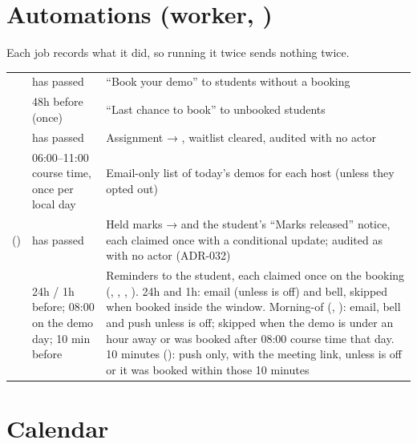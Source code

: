 \section[Automations]{Automations (worker, )}

Each job records what it did, so running it twice sends nothing twice.

{\tablefont
\begin{xltabular}{\linewidth}{@{}P{30mm} P{30mm} L@{}}
  \toprule
   &  & \\
  \midrule
  \endhead
   &  has passed & ``Book your demo'' to students without a booking\\
   & 48h before  (once) & ``Last chance to book'' to unbooked students\\
   &  has passed & Assignment → , waitlist cleared, audited with no actor\\
   & 06:00--11:00 course time, once per local day & Email-only list of today's demos for each host (unless they opted out)\\
   () &  has passed & Held marks →  and the student's ``Marks released'' notice, each claimed once with a conditional update; audited as  with no actor (ADR-032)\\
   & 24h / 1h before; 08:00 on the demo day; 10 min before & Reminders to the student, each claimed once on the booking (, , , ). 24h and 1h: email (unless  is off) and bell, skipped when booked inside the window. Morning-of (, ): email, bell and push unless  is off; skipped when the demo is under an hour away or was booked after 08:00 course time that day. 10 minutes (): push only, with the meeting link, unless  is off or it was booked within those 10 minutes\\
  \bottomrule
\end{xltabular}}

\section{Calendar}

